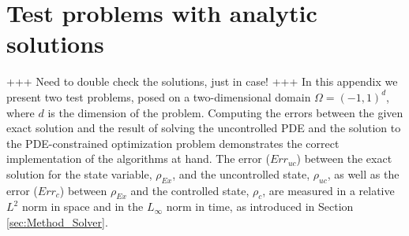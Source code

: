 \section{Test problems with analytic solutions}\label{app:TestProblems}
+++ Need to double check the solutions, just in case! +++
In this appendix we present two test problems, posed on a two-dimensional domain $\Omega=(-1,1)^d$, where $d$ is the dimension of the problem.
Computing the errors between the given exact solution and the result of solving the uncontrolled PDE and the solution to the PDE-constrained optimization problem demonstrates the correct implementation of the algorithms at hand.  The error ($Err_{uc}$) between the exact solution for the state variable, $\rho_{Ex}$, and the uncontrolled state, $\rho_{uc}$, as well as the error ($Err_c$) between $\rho_{Ex}$ and the controlled state, $\rho_c$, are measured in a relative $L^2$ norm in space and in the $L_\infty$ norm in time, as introduced in Section \ref{sec:Method_Solver}.
\vspace{0.75em}

